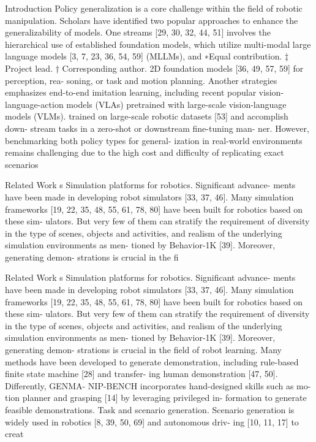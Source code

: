 \documentclass{beamer}
\begin{document}
\begin{frame}{Introduction}
Policy generalization is a core challenge within the field of
robotic manipulation. Scholars have identified two popular
approaches to enhance the generalizability of models. One
streams [29, 30, 32, 44, 51] involves the hierarchical use of
established foundation models, which utilize multi-modal
large language models [3, 7, 23, 36, 54, 59] (MLLMs), and
∗Equal contribution.
‡ Project lead.
† Corresponding author.
2D foundation models [36, 49, 57, 59] for perception, rea-
soning, or task and motion planning. Another strategies
emphasizes end-to-end imitation learning, including recent
popular vision-language-action models (VLAs) pretrained
with large-scale vision-language models (VLMs). trained
on large-scale robotic datasets [53] and accomplish down-
stream tasks in a zero-shot or downstream fine-tuning man-
ner. However, benchmarking both policy types for general-
ization in real-world environments remains challenging due
to the high cost and difficulty of replicating exact scenarios

\end{frame}

\begin{frame}{Related Work}
s
Simulation platforms for robotics. Significant advance-
ments have been made in developing robot simulators [33,
37, 46]. Many simulation frameworks [19, 22, 35, 48, 55,
61, 78, 80] have been built for robotics based on these sim-
ulators. But very few of them can stratify the requirement
of diversity in the type of scenes, objects and activities, and
realism of the underlying simulation environments as men-
tioned by Behavior-1K [39]. Moreover, generating demon-
strations is crucial in the fi
\end{frame}

\begin{frame}{Related Work}
s
Simulation platforms for robotics. Significant advance-
ments have been made in developing robot simulators [33,
37, 46]. Many simulation frameworks [19, 22, 35, 48, 55,
61, 78, 80] have been built for robotics based on these sim-
ulators. But very few of them can stratify the requirement
of diversity in the type of scenes, objects and activities, and
realism of the underlying simulation environments as men-
tioned by Behavior-1K [39]. Moreover, generating demon-
strations is crucial in the field of robot learning.
Many
methods have been developed to generate demonstration,
including rule-based finite state machine [28] and transfer-
ing human demonstration [47, 50]. Differently, GENMA-
NIP-BENCH incorporates hand-designed skills such as mo-
tion planner and grasping [14] by leveraging privileged in-
formation to generate feasible demonstrations.
Task and scenario generation.
Scenario generation is
widely used in robotics [8, 39, 50, 69] and autonomous driv-
ing [10, 11, 17] to creat
\end{frame}
\end{document}
